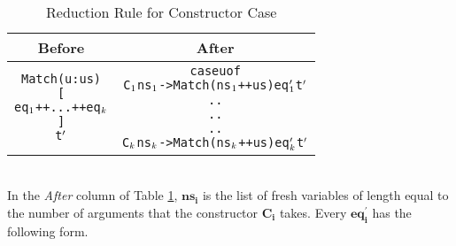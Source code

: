 \documentclass[11pt]{article}
\begin{document}
\begin{table}[h!]
\begin{center}
\begin{tabular}{|c|c|} \hline
{\bf Before} & {\bf After} \\ 
\hline
\begin{minipage}{3in}
\begin{alltt}

Match (u:us) 
         [
           eq\(\sb{1}\) ++ ... ++ eq\(\sb{k}\) 
         ]
         t\(\sp{\prime}\)  

\end{alltt} 
\end {minipage} &
\begin{minipage}{3in}
\begin{alltt}

    case u of 
       C\(\sb{1}\) ns\(\sb{1}\) -> Match (ns\(\sb{1}\) ++ us) eq\(\sb{1}\sp{\prime}\) t\(\sp{\prime}\) 
         .              .
         .              .
         .              .
       C\(\sb{k}\) ns\(\sb{k}\) -> Match (ns\(\sb{k}\) ++ us) eq\(\sb{k}\sp{\prime}\) t\(\sp{\prime}\) 

\end{alltt} 
\end {minipage}
\tabularnewline
\hline
\end{tabular}
\caption{Reduction Rule for Constructor Case}
\label{consRule}
\end{center}
\end{table}
~~\\
In the {\em After} column of Table \ref{consRule}, $\mathbf{ns_i}$ is the list of fresh variables of length equal to the number of arguments that the constructor $\mathbf{C_i}$ takes. Every $\mathbf{eq_i^\prime}$ has the following form.
\end{document}
